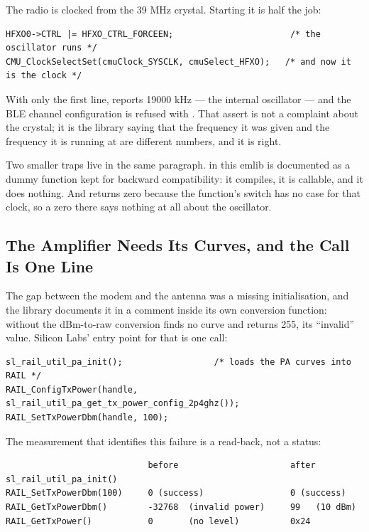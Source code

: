The radio is clocked from the 39 MHz crystal. Starting it is half the job:

\begin{verbatim}
HFXO0->CTRL |= HFXO_CTRL_FORCEEN;                       /* the oscillator runs */
CMU_ClockSelectSet(cmuClock_SYSCLK, cmuSelect_HFXO);   /* and now it is the clock */
\end{verbatim}

With only the first line,  reports 19000 kHz --- the internal
oscillator --- and the BLE channel configuration is refused with
. That assert is not a complaint about the crystal; it
is the library saying that the frequency it was given and the frequency it is running at are different
numbers, and it is right.

Two smaller traps live in the same paragraph.  in this emlib is
documented as a dummy function kept for backward compatibility: it compiles, it is callable, and it
does nothing. And  returns zero because the function's
switch has no case for that clock, so a zero there says nothing at all about the oscillator.

\subsection{The Amplifier Needs Its Curves, and the Call Is One Line}

The gap between the modem and the antenna was a missing initialisation, and the library documents it in
a comment inside its own conversion function: without  the
dBm-to-raw conversion finds no curve and returns 255, its ``invalid'' value. Silicon Labs' entry point
for that is one call:

\begin{verbatim}
sl_rail_util_pa_init();                  /* loads the PA curves into RAIL */
RAIL_ConfigTxPower(handle, sl_rail_util_pa_get_tx_power_config_2p4ghz());
RAIL_SetTxPowerDbm(handle, 100);
\end{verbatim}

The measurement that identifies this failure is a read-back, not a status:

\begin{verbatim}
                            before                      after sl_rail_util_pa_init()
RAIL_SetTxPowerDbm(100)     0 (success)                 0 (success)
RAIL_GetTxPowerDbm()        -32768  (invalid power)     99   (10 dBm)
RAIL_GetTxPower()           0       (no level)          0x24
\end{verbatim}

